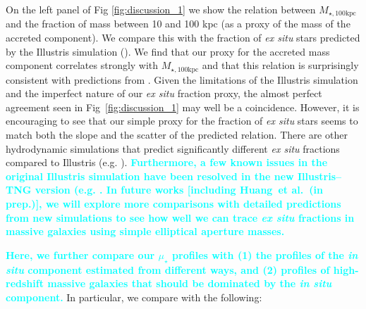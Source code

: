 \documentclass[fleqn,usenatbib]{mnras}
\def\etal{{\ et al.~}}
\def\mtot{{$M_{\star,100\mathrm{kpc}}$}}
\def\mden{{$\mu_{\star}$}}
\newcommand{\song}[1]{\textcolor{cyan}{\textbf{#1}}}
\begin{document}
    On the left panel of Fig \ref{fig:discussion_1} we show 
    the relation between \mtot{} and the fraction of mass between 10 and 100 kpc 
    (as a proxy of the mass of the accreted component).
    We compare this with the fraction of \textit{ex situ} stars predicted by the 
    Illustris simulation (\citealt{RodriguezGomez2016}).  
    We find that our proxy for the accreted mass component correlates strongly with  
    \mtot{} and that this relation is surprisingly consistent with predictions from
    \citet{RodriguezGomez2016}.  
    Given the limitations of the Illustris simulation and the imperfect nature of 
    our \textit{ex situ} fraction proxy, the almost perfect agreement seen in 
    Fig~\ref{fig:discussion_1} may well be a coincidence.  
    However, it is encouraging to see that our simple proxy for the fraction of 
    \textit{ex situ} stars seems to match both the slope and the scatter of the 
    predicted relation.  
    There are other hydrodynamic simulations that predict significantly different 
    \textit{ex situ} fractions compared to Illustris (e.g. \citealt{Lackner2012, 
    Qu2017}). 
    \song{
    Furthermore, a few known issues in the original Illustris simulation have been 
    resolved in the new Illustris--TNG version (e.g. \citealt{Genel2017, 
    Pillepich2017}.
    In future works [including Huang\etal (in prep.)], we will explore more 
    comparisons with detailed predictions from new simulations to see how well we 
    can trace \textit{ex situ} fractions in massive galaxies using simple 
    elliptical aperture masses.
    }
    
    \song{
    Here, we further compare our \mden{} profiles with 
    (1) the profiles of the \textit{in situ} component estimated from different ways,
    and (2) profiles of high-redshift massive galaxies that should be dominated by 
    the \textit{in situ} component.  
    }
    In particular, we compare with the following:   
  
\end{document}
